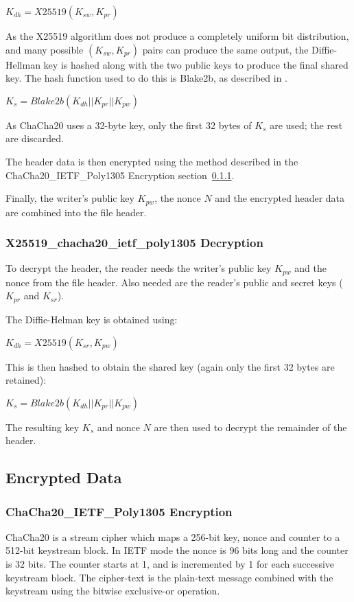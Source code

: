 \documentclass[10pt]{article}
\begin{document}
$K_{dh} = X25519(K_{sw}, K_{pr})$

As the X25519 algorithm does not produce a completely uniform bit distribution, and many possible $(K_{sw}, K_{pr})$
pairs can produce the same output, the Diffie-Hellman key is hashed along with the two public keys to produce the
final shared key.
The hash function used to do this is Blake2b, as described in \cite{RFC7693}.

$K_s = Blake2b(K_{dh} || K_{pr} || K_{pw})$

As ChaCha20 uses a 32-byte key, only the first 32 bytes of $K_s$ are used; the rest are discarded.

The header data is then encrypted using the method described in the ChaCha20\_IETF\_Poly1305 Encryption
section~\ref{data:chacha20_encryption}.

Finally, the writer's public key $K_{pw}$, the nonce $N$ and the encrypted header data are combined into
the file header.

\subsubsection{X25519\_chacha20\_ietf\_poly1305 Decryption}

To decrypt the header, the reader needs the writer's public key $K_{pw}$ and the nonce from the file header.
Also needed are the reader's public and secret keys ($K_{pr}$ and $K_{sr}$).

The Diffie-Helman key is obtained using:

$K_{dh} = X25519(K_{sr}, K_{pw})$

This is then hashed to obtain the shared key (again only the first 32 bytes are retained):

$K_s = Blake2b(K_{dh} || K_{pr} || K_{pw})$

The resulting key $K_s$ and nonce $N$ are then used to decrypt the remainder of the header.

\subsection{Encrypted Data}
\subsubsection{ChaCha20\_IETF\_Poly1305 Encryption}\label{data:chacha20_encryption}

ChaCha20 is a stream cipher which maps a 256-bit key, nonce and counter to a 512-bit keystream block.
In IETF mode the nonce is 96 bits long and the counter is 32 bits.
The counter starts at 1, and is incremented by 1 for each successive keystream block.
The cipher-text is the plain-text message combined with the keystream using the bitwise exclusive-or operation.
\end{document}
